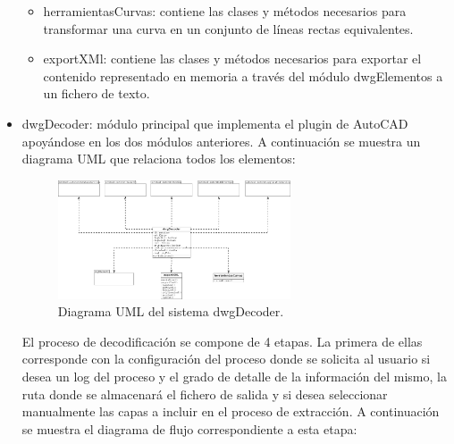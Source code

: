 \begin{itemize}
\begin{itemize}

\item{herramientasCurvas: contiene las clases y métodos necesarios para transformar una curva en un conjunto de líneas rectas equivalentes.}
\item{exportXMl: contiene las clases y métodos necesarios para exportar el contenido representado en memoria a través del módulo dwgElementos a un fichero de texto.}

\end{itemize}

\item{dwgDecoder: módulo principal que implementa el plugin de AutoCAD apoyándose en los dos módulos anteriores. A continuación se muestra un diagrama UML que relaciona todos los elementos:}

\begin{figure}[H]
\begin{center}
\includegraphics[width=0.65\textwidth]{imgs/dwgDecoder}
\caption{Diagrama UML del sistema dwgDecoder.}
\end{center}
\end{figure}

El proceso de decodificación se compone de 4 etapas. La primera de ellas corresponde con la configuración del proceso donde se solicita al usuario si desea un log del proceso y el grado de detalle de la información del mismo, la ruta donde se almacenará el fichero de salida y si desea seleccionar manualmente las capas a incluir en el proceso de extracción. A continuación se muestra el diagrama de flujo correspondiente a esta etapa:


\end{itemize}
